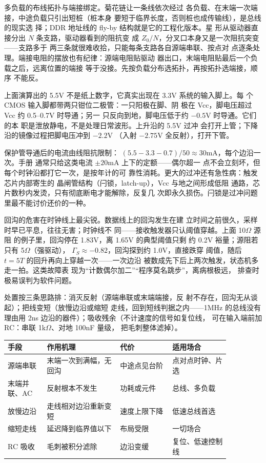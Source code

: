 多负载的布线拓扑与端接绑定。菊花链让一条线依次经过
各负载、在末端一次端接，中途负载只引出短桩（桩本身
要短于临界长度，否则桩也成传输线），是总线的现实选
择；DDR 地址线的 fly-by 结构就是它的工程化版本。星
形从驱动器直接分出 $N$ 条支路，驱动器看到的阻抗变
成 $Z_0/N$，分叉口本身又是一次阻抗突变——支路多于
两三条就很难收拾，只能每条支路各自源端串联、按点对
点逐条处理。端接电阻的摆放也有纪律：源端电阻贴驱动
器出口，末端电阻贴最后一个负载之后，远离位置的端接
等于没接。先按负载分布选拓扑，再按拓扑选端接，顺序
不能反。

上面演算出的 5.5V
不是纸上数字，它真实出现在 3.3V 系统的输入脚上。每
个 CMOS 输入脚都带两只钳位二极管：一只阳极在脚、阴
极在 Vcc，脚电压超过 Vcc 约 0.5--0.7V 时导通；另一
只反向到地，脚电压低于约 $-0.5$V 时导通。它们的本
职是泄放静电，不是处理日常波形。上升沿的 5.5V 过冲
会打开上管；下降沿的镜像过程把脚电压冲到 $-2.2$V
（入射 $-2.75$V 全反射），打开下管。

保护管导通后的电流由线阻抗限制：
$(5.5-3.3-0.7)/50\approx30$mA，每个边沿一次。手册
通常只给这类电流 $\pm20$mA 上下的定额——偶尔超一
点不会立刻坏，但每个时钟沿都打它一次，是按年计的可
靠性消耗。更大的过冲还有急性病：触发芯片内部寄生的
晶闸管结构（闩锁，latch-up），Vcc 与地之间形成低阻
通路，芯片数秒内发烫，只有彻底断电才能解除，反复几
次即永久损伤。闩锁是过冲问题里最不能讨价还价的一种。

回沟的危害在时钟线上最尖锐。数据线上的回沟发生在建
立时间之前很久，采样时早已平息，往往无害；时钟线不
同——接收触发器只认阈值穿越。上面 10$\Omega$ 源阻
的例子里，回沟停在 1.83V，离 1.65V 的典型阈值只剩
约 0.2V 裕量；源阻若只有 5$\Omega$（强驱动），
$\Gamma_S\approx-0.82$，回沟探到约 1.0V，直接跌穿
阈值，随后 $t=5T$ 的回升再向上穿越一次——一次边沿
被数成先下后上两次触发，状态机多走一拍。这类故障表
现为“计数偶尔加二”“程序莫名跳步”，离病根极远，
排查时极易误判为软件问题。

处置按三条思路排：消灭反射（源端串联或末端端接，反
射不存在，回沟无从谈起）；把线变短（放慢边沿或缩短
走线，回到短线判据之内——1MHz 的总线没有理由用
2ns 边沿的器件）；吸收残余（不计速度的信号如复位线，
可在输入端前加 RC：串联 1k$\Omega$、对地 100nF 量级，
把毛刺整体滤掉）。

\begin{longtable}{L{0.15\linewidth}L{0.29\linewidth}L{0.2\linewidth}L{0.22\linewidth}}
\toprule
手段 & 作用机理 & 代价 & 适用场合 \\
\midrule
源端串联 & 末端一次到满幅，无回沟 & 中途点见台阶 & 点对点时钟、片选 \\
末端并联、AC & 反射根本不发生 & 功耗或元件 & 总线、多负载 \\
放慢边沿 & 走线相对边沿重新变短 & 速度上限下降 & 低速总线首选 \\
缩短走线 & 延迟降到临界值以下 & 布局受限 & 一切场合 \\
RC 吸收 & 毛刺被积分滤除 & 边沿变缓 & 复位、低速控制线 \\
\bottomrule
\end{longtable}

